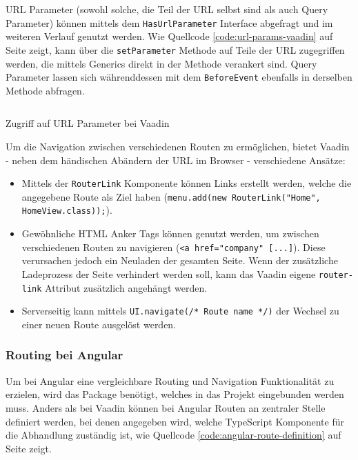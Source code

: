 \documentclass[a4paper,12pt,twoside]{scrreprt}
\begin{document}
\newpage

URL Parameter (sowohl solche, die Teil der URL selbst sind als auch Query Parameter) können mittels dem \texttt{HasUrlParameter} Interface abgefragt und im weiteren Verlauf genutzt werden. Wie Quellcode \ref{code:url-params-vaadin} auf Seite \pageref{code:url-params-vaadin} zeigt, kann über die \texttt{setParameter} Methode auf Teile der URL zugegriffen werden, die mittels Generics direkt in der Methode verankert sind. \parencite[][]{vaadin_ltd_typed_2021} Query Parameter lassen sich währenddessen mit dem \texttt{BeforeEvent} ebenfalls in derselben Methode abfragen. \parencite[][]{vaadin_ltd_query_2021}

\begin{listing}[ht]
    \inputminted[fontsize=\footnotesize,linenos]{java}{code/Luidold_Vaadin-URL-params.java}
    \caption[Zugriff auf URL Parameter bei Vaadin]{Zugriff auf URL Parameter bei Vaadin}
    \label{code:url-params-vaadin}
\end{listing}

\smallskip

Um die Navigation zwischen verschiedenen Routen zu ermöglichen, bietet Vaadin - neben dem händischen Abändern der URL im Browser - verschiedene Ansätze:

\begin{itemize}
    \item Mittels der \texttt{RouterLink} Komponente können Links erstellt werden, welche die angegebene Route als Ziel haben (\texttt{menu.add(new RouterLink("Home", HomeView.class));}). \parencite[][Using the RouterLink Component]{vaadin_ltd_navigating_2021}
    \item Gewöhnliche HTML Anker Tags können genutzt werden, um zwischen verschiedenen Routen zu navigieren (\texttt{<a href="company" [...]}). Diese verursachen jedoch ein Neuladen der gesamten Seite. Wenn der zusätzliche Ladeprozess der Seite verhindert werden soll, kann das Vaadin eigene \texttt{router-link} Attribut zusätzlich angehängt werden. \parencite[][Using Standard href Links]{vaadin_ltd_navigating_2021}
    \item Serverseitig kann mittels \texttt{UI.navigate(/* Route name */)} der Wechsel zu einer neuen Route ausgelöst werden. \parencite[][Server-side Navigation]{vaadin_ltd_navigating_2021}
\end{itemize}

\subsubsection{Routing bei Angular}
\label{sub-sub-sec:routing-herangehensweise-angular}
Um bei Angular eine vergleichbare Routing und Navigation Funktionalität zu erzielen, wird das  Package benötigt, welches in das Projekt eingebunden werden muss. Anders als bei Vaadin können bei Angular Routen an zentraler Stelle definiert werden, bei denen angegeben wird, welche TypeScript Komponente für die Abhandlung zuständig ist, wie Quellcode \ref{code:angular-route-definition} auf Seite \pageref{code:angular-route-definition} zeigt. \parencite[][]{google_llc_angular_nodate}
\end{document}
